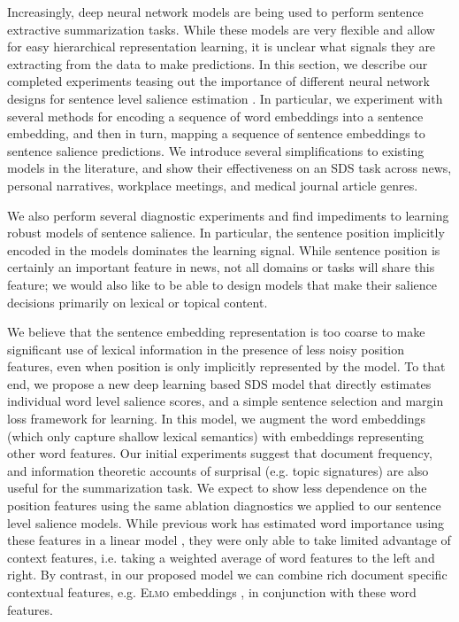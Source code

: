 
Increasingly, deep neural 
network models are being used to perform sentence extractive summarization 
tasks. While these models are very flexible and allow for easy hierarchical 
representation learning, it is unclear what signals they are extracting
from the data to make predictions.
In this section, we describe our completed experiments teasing out the 
importance
of different neural network designs for sentence level salience estimation
\citep{kedzie2018deep}. 
In particular, we experiment with several methods for encoding a sequence
of word embeddings into a sentence embedding, and then in turn, mapping
a sequence of sentence embeddings to sentence salience predictions. We 
introduce several simplifications to existing models in the literature, and
show their effectiveness on an SDS task across news, personal narratives,
workplace meetings, and medical journal article genres.

We also perform several diagnostic experiments 
and find impediments to learning robust models of 
sentence salience. In particular, the sentence position implicitly 
encoded in the models dominates the learning signal. While sentence position
is certainly an important feature in news, not all domains or tasks 
will share this feature;
 we would also like to be able to design
models that make their salience decisions primarily on lexical or
topical content.

We believe that the sentence embedding representation is too coarse to
make significant use of lexical information in the presence of less noisy
position features, even when position is only implicitly represented by 
the model.
To that end, we propose a new deep learning based SDS model that directly 
estimates individual word level salience scores, and a simple sentence 
selection and margin loss framework for learning. In this model,
we augment the word embeddings (which only capture shallow lexical semantics)
with embeddings representing other word features. Our initial experiments
suggest that document frequency, and information theoretic accounts of 
surprisal (e.g. topic signatures) are also useful for the summarization task. 
We expect to show less dependence on the position features using
the same ablation diagnostics we applied to our sentence level salience 
models. 
While previous work has estimated word importance using these features
in a linear model 
\citep{hong2014improving}, they were only able to take limited advantage of 
context features, i.e. taking a weighted average of word features to
the left and right. By contrast,
 in our proposed model we can combine rich
document specific contextual features, e.g. \textsc{Elmo} embeddings 
\citep{peters2018deep}, in conjunction with these word features.

